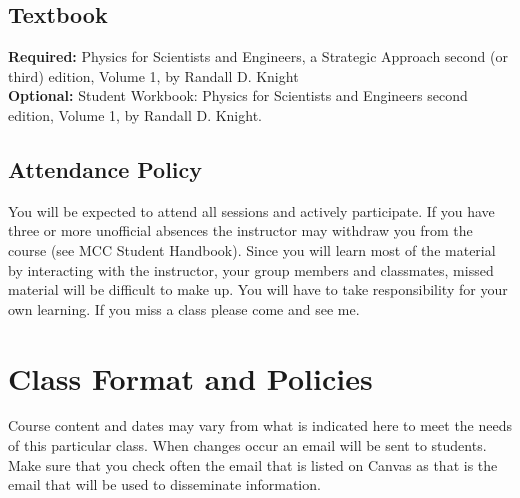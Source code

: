 \documentclass[12pt]{article}
\begin{document}
\subsection*{Textbook}
\textbf{Required:} Physics for Scientists and Engineers, a Strategic Approach second (or third) edition, Volume 1, by Randall D. Knight \\
\textbf{Optional:} Student Workbook: Physics for Scientists and Engineers second edition, Volume 1, by Randall D. Knight.


\subsection*{Attendance Policy}
You will be expected to attend all sessions and actively participate. If you have three or more unofficial absences the instructor may withdraw you from the course (see MCC Student Handbook). Since you will learn most of the material by interacting with the instructor, your group members and classmates, missed material will be difficult to make up. You will have to take responsibility for your own learning. If you miss a class please come and see me.

\section*{Class Format and Policies}
Course content and dates may vary from what is indicated here to meet the needs of this particular class. When changes occur an email will be sent to students. Make sure that you check often the email that is listed on Canvas as that is the email that will be used to disseminate information.
\end{document}
